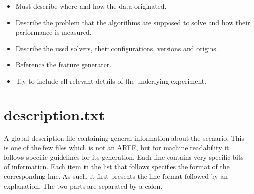 \begin{itemize}
  	\item Must describe where and how the data originated.
    	\item Describe the problem that the algorithms are supposed to solve and how their performance is measured. 
	\item Describe the used solvers, their configurations, versions and origins.
    	\item Reference the feature generator. 
    	\item Try to include all relevant details of the underlying experiment.   
\end{itemize} 


\section{description.txt}

A global description file containing general information about the scenario. This is one of the few files which is not an 
ARFF, but for machine readability it follows specific guidelines for its generation. Each line contains very specific
bits of information. Each item in the list that follows specifies the format of the corresponding line. As such, it first 
presents the line format followed by an explanation. The two parts are separated by a colon.

